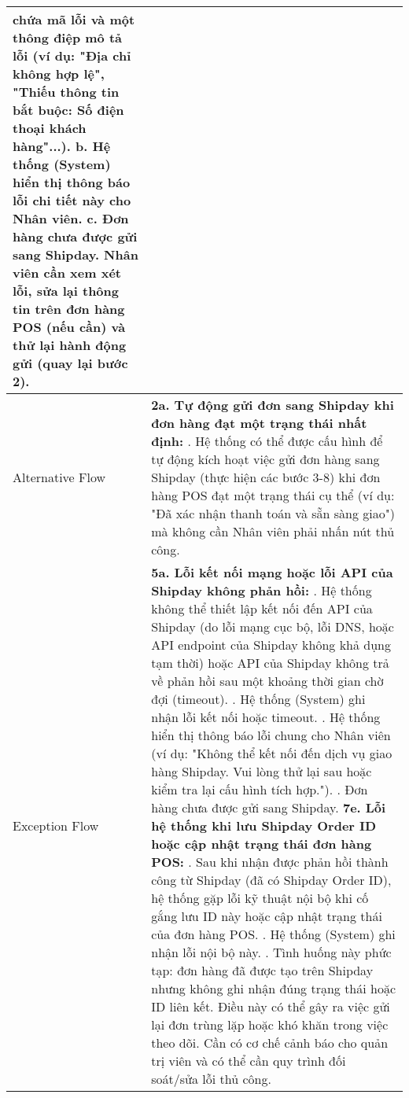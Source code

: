 \begin{longtable}{|m{4cm}|p{11cm}|}
chứa mã lỗi và một thông điệp mô tả lỗi (ví dụ: "Địa chỉ không hợp lệ", "Thiếu thông tin bắt buộc: Số điện thoại khách hàng"...). \newline    b. Hệ thống (System) hiển thị thông báo lỗi chi tiết này cho Nhân viên. \newline    c. Đơn hàng chưa được gửi sang Shipday. Nhân viên cần xem xét lỗi, sửa lại thông tin trên đơn hàng POS (nếu cần) và thử lại hành động gửi (quay lại bước 2). \\
\hline
Alternative Flow & \textbf{2a. Tự động gửi đơn sang Shipday khi đơn hàng đạt một trạng thái nhất định:} \newline    1. Hệ thống có thể được cấu hình để tự động kích hoạt việc gửi đơn hàng sang Shipday (thực hiện các bước 3-8) khi đơn hàng POS đạt một trạng thái cụ thể (ví dụ: "Đã xác nhận thanh toán và sẵn sàng giao") mà không cần Nhân viên phải nhấn nút thủ công. \\
\hline
Exception Flow & \textbf{5a. Lỗi kết nối mạng hoặc lỗi API của Shipday không phản hồi:} \newline    1. Hệ thống không thể thiết lập kết nối đến API của Shipday (do lỗi mạng cục bộ, lỗi DNS, hoặc API endpoint của Shipday không khả dụng tạm thời) hoặc API của Shipday không trả về phản hồi sau một khoảng thời gian chờ đợi (timeout). \newline    2. Hệ thống (System) ghi nhận lỗi kết nối hoặc timeout. \newline    3. Hệ thống hiển thị thông báo lỗi chung cho Nhân viên (ví dụ: "Không thể kết nối đến dịch vụ giao hàng Shipday. Vui lòng thử lại sau hoặc kiểm tra lại cấu hình tích hợp."). \newline    4. Đơn hàng chưa được gửi sang Shipday. \newline \textbf{7e. Lỗi hệ thống khi lưu Shipday Order ID hoặc cập nhật trạng thái đơn hàng POS:} \newline    1. Sau khi nhận được phản hồi thành công từ Shipday (đã có Shipday Order ID), hệ thống gặp lỗi kỹ thuật nội bộ khi cố gắng lưu ID này hoặc cập nhật trạng thái của đơn hàng POS. \newline    2. Hệ thống (System) ghi nhận lỗi nội bộ này. \newline    3. Tình huống này phức tạp: đơn hàng đã được tạo trên Shipday nhưng không ghi nhận đúng trạng thái hoặc ID liên kết. Điều này có thể gây ra việc gửi lại đơn trùng lặp hoặc khó khăn trong việc theo dõi. Cần có cơ chế cảnh báo cho quản trị viên và có thể cần quy trình đối soát/sửa lỗi thủ công. \\

\end{longtable}
